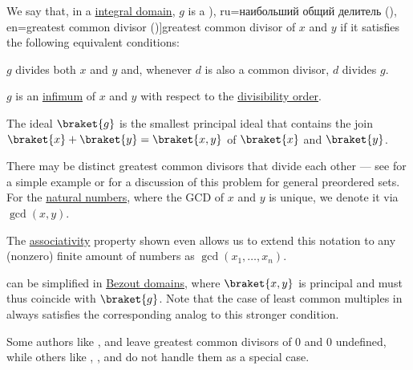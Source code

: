 \begin{definition}\label{def:gcd}
  We say that, in a \hyperref[def:integral_domain]{integral domain}, \( g \) is a \term[bg=най-голям общ делител (на два полинома) (\cite[173]{Обрешков1962ВисшаАлгебра}), ru=наибольший общий делитель (\cite[def. 3.5.3]{Винберг2014Алгебра}), en=greatest common divisor (\cite[def. V.2.2]{Aluffi2009Algebra})]{greatest common divisor} of \( x \) and \( y \) if it satisfies the following equivalent conditions:

  \begin{thmenum}
     \( g \) divides both \( x \) and \( y \) and, whenever \( d \) is also a common divisor, \( d \) divides \( g \).

     \( g \) is an \hyperref[def:extremal_points/supremum_and_infimum]{infimum} of \( x \) and \( y \) with respect to the \hyperref[thm:semiring_divisibility_order]{divisibility order}.

     The ideal \( \braket{ g } \) is the smallest principal ideal that contains the join \( \braket{ x } + \braket{ y } = \braket{ x, y } \) of \( \braket{ x } \) and \( \braket{ y } \).
  \end{thmenum}
\end{definition}
\begin{comments}
  \item There may be distinct greatest common divisors that divide each other --- see  for a simple example or  for a discussion of this problem for general preordered sets. For the \hyperref[def:natural_numbers]{natural numbers}, where the GCD of \( x \) and \( y \) is unique, we denote it via \( \gcd(x, y) \).

  The \hyperref[def:binary_operation/associative]{associativity} property shown  even allows us to extend this notation to any (nonzero) finite amount of numbers as \( \gcd(x_1, \ldots, x_n) \).

  \item {} can be simplified in \hyperref[def:bezout_domain]{Bezout domains}, where \( \braket{ x, y } \) is principal and must thus coincide with \( \braket{ g } \). Note that the case of least common multiples in  always satisfies the corresponding analog to this stronger condition.

  \item Some authors like ,  and  leave greatest common divisors of \( 0 \) and \( 0 \) undefined, while others like , ,  and  do not handle them as a special case.
\end{comments}
